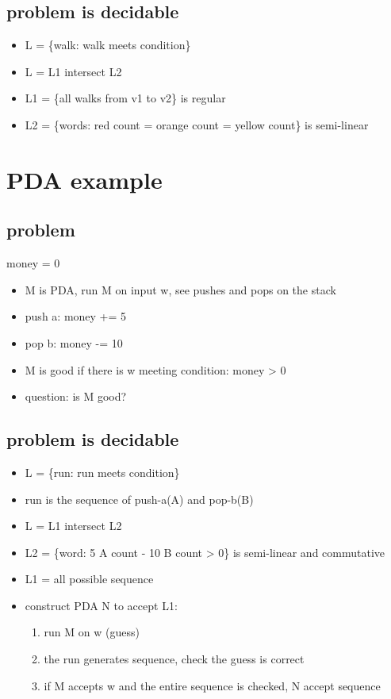 \documentclass{article}
\begin{document}
\subsection{problem is decidable}
\begin{itemize}
	\item L = \{walk: walk meets condition\}
	\item L = L1 intersect L2
	\item L1 = \{all walks from v1 to v2\} is regular
	\item L2 = \{words: red count = orange count = yellow count\} is semi-linear
\end{itemize}

\section{PDA example}

\subsection{problem}
money = 0
\begin{itemize}
	\item M is PDA, run M on input w, see pushes and pops on the stack
	\item push a: money += 5
	\item pop b: money -= 10
	\item M is good if there is w meeting condition: money > 0
	\item question: is M good?
\end{itemize}

\subsection{problem is decidable}
\begin{itemize}
	\item L = \{run: run meets condition\}
	\item run is the sequence of push-a(A) and pop-b(B)
	\item L = L1 intersect L2
	\item L2 = \{word: 5 A count - 10 B count > 0\} is semi-linear and commutative
	\item L1 = all possible sequence
	\item construct PDA N to accept L1:
	\begin{enumerate}
		\item run M on w (guess)
		\item the run generates sequence, check the guess is correct
		\item if M accepts w and the entire sequence is checked, N accept sequence
	\end{enumerate}
\end{itemize}
\end{document}
